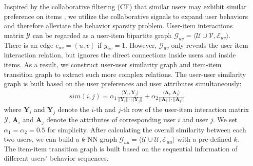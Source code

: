 Inspired by the collaborative filtering (CF) that similar users may exhibit similar preference on items \cite{sarwar2001item}, we utilize the collaborative signals to expand user behaviors and therefore alleviate the behavior sparsity problem. 
User-item interactions matrix $\mathcal{Y}$ can be regarded as a user-item bipartite graph $\mathcal{G}_{uv}=\langle \mathcal{U}\cup\mathcal{V}, \mathcal{E}_{uv}\rangle$. 
There is an edge $e_{uv}=(u,v)$ if $y_{uv} = 1$. 
However, $\mathcal{G}_{uv}$ only reveals the user-item interaction relation, but ignores the direct connections inside users and inside items. 
As a result, we construct user-user similarity graph and item-item transition graph to extract such more complex relations.
The user-user similarity graph is built based on the user preferences and user attributes simultaneously:
\begin{align}
    sim(i,j) = \alpha_1\frac{\langle\textbf{Y}_i,\textbf{Y}_j\rangle}{||\textbf{Y}_i|| \cdot ||\textbf{Y}_j||} + \alpha_2\frac{\langle\textbf{A}_i,\textbf{A}_j\rangle}{||\textbf{A}_i|| \cdot ||\textbf{A}_j||}
\end{align}
where $\textbf{Y}_i$ and $\textbf{Y}_j$ denote the $i$-th and $j$-th row of the user-item interaction matrix $\mathcal{Y}$, $\textbf{A}_i$ and $\textbf{A}_j$ denote the attributes of corresponding user $i$ and user $j$.
We set $\alpha_1 = \alpha_2 = 0.5$ for simplicity. 
After calculating the overall similarity between each two users, we can build a $k$-NN graph $\mathcal{G}_{uu}=\langle \mathcal{U}\cup\mathcal{U}, \mathcal{E}_{uu}\rangle$ with a pre-defined $k$. 
The item-item transition graph is built based on the sequential information of different users' behavior sequences.
